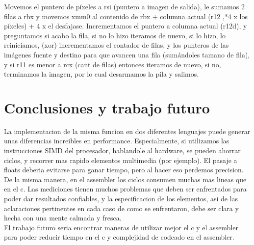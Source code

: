 \documentclass[a4paper]{article}
\begin{document}
  \hfill \break
  Movemos el puntero de píxeles a rsi (puntero a imagen de salida), le sumamos 2 filas a rbx y movemos xmm0 al contenido de rbx + columna actual (r12 ,*4 x los píxeles) + 4 x el desfajase. 
  \hfill \break
  Incrementamos el puntero a  columna actual (r12d), y preguntamos si acabo la fila, si no lo hizo iteramos de nuevo, si lo hizo, lo reiniciamos, (xor) incrementamos el contador de filas, y  los punteros de las imágenes fuente y destino para que avancen una fila (sumándoles tamano de fila), y si r11 es menor a rcx (cant de filas) entonces iteramos de nuevo, si no, terminamos la imagen, por lo cual desarmamos la pila y salimos. 
 \hfill \break
 

 







 
 

  
 

    
   
 
 
 
    	
	  
	
	 
	 
	
	
	   
		
	
	
	
	
	
	


	
	
	  



\section{Conclusiones y trabajo futuro}
\hfill \break
La implementacion de la misma funcion en dos diferentes lenguajes puede generar unas diferencias increibles en performance. Especialmente, si utilizamos las instrucciones SIMD del procesador, hablandole al hardware, se pueden ahorrar ciclos, y recorrer mas rapido elementos multimedia (por ejemplo).
El pasaje a floats deberia evitarse para ganar tiempo, pero al hacer eso perdemos precision. De la misma manera, en el assembler los ciclos consumen muchas mas lineas que en el c. 
Las mediciones tienen muchos problemas que deben ser enfrentados para poder dar resultados confiables, y la especificacion de los elementos, asi de las aclaraciones pertinentes en cada caso de como se enfrentaron,  debe ser clara y hecha con una mente calmada y fresca. 
\hfill \break
\\
El trabajo futuro seria encontrar maneras de utilizar mejor el c y el assembler para poder reducir tiempo en el c y complejidad de codeado en el assembler. 
\hfill \break
\end{document}

